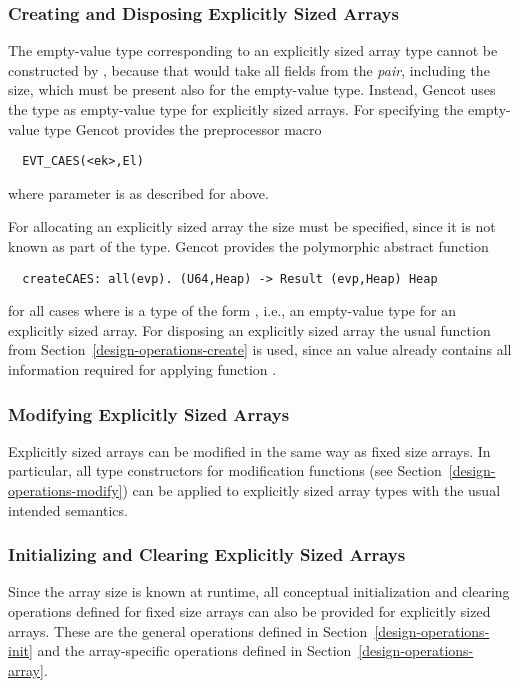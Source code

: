 \subsubsection{Creating and Disposing Explicitly Sized Arrays}

The empty-value type corresponding to an explicitly sized array type  cannot be constructed by 
, because that would take all fields from the \textit{pair}, including the size, which must be present
also for the empty-value type. Instead, Gencot uses the type  as empty-value type for explicitly sized arrays.
For specifying the empty-value type Gencot provides the preprocessor macro
\begin{verbatim}
  EVT_CAES(<ek>,El)
\end{verbatim}
where parameter  is as described for  above.

For allocating an explicitly sized array the size must be specified, since it is not known as part of the type.
Gencot provides the polymorphic abstract function
\begin{verbatim}
  createCAES: all(evp). (U64,Heap) -> Result (evp,Heap) Heap
\end{verbatim}
for all cases where  is a type of the form , i.e., an empty-value type for an explicitly
sized array. For disposing an explicitly sized array the usual function  from Section~\ref{design-operations-create}
is used, since an  value already contains all information required for applying function .

\subsubsection{Modifying Explicitly Sized Arrays}

Explicitly sized arrays can be modified in the same way as fixed size arrays. In particular, 
all type constructors for modification functions (see Section~\ref{design-operations-modify}) can be applied to 
explicitly sized array types with the usual intended semantics. 

\subsubsection{Initializing and Clearing Explicitly Sized Arrays}

Since the array size is known at runtime, all conceptual initialization and clearing operations defined for fixed
size arrays can also be provided for explicitly sized arrays. These are the general operations defined in 
Section~\ref{design-operations-init} and the array-specific operations defined in Section~\ref{design-operations-array}.


